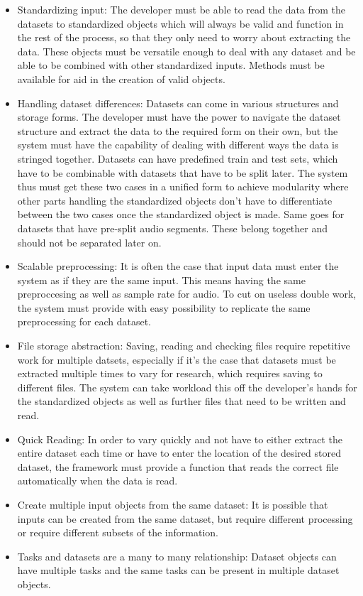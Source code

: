 \begin{itemize}
	\item Standardizing input: The developer must be able to read the data from the datasets to standardized objects which will always be valid and function in the rest of the process, so that they only need to worry about extracting the data. These objects must be versatile enough to deal with any dataset and be able to be combined with other standardized inputs. Methods must be available for aid in the creation of valid objects.
	\item Handling dataset differences: Datasets can come in various structures and storage forms. The developer must have the power to navigate the dataset structure and extract the data to the required form on their own, but the system must have the capability of dealing with different ways the data is stringed together. Datasets can have predefined train and test sets, which have to be combinable with datasets that have to be split later. The system thus must get these two cases in a unified form to achieve modularity where other parts handling the standardized objects don't have to differentiate between the two cases once the standardized object is made. Same goes for datasets that have pre-split audio segments. These belong together and should not be separated later on.
	\item Scalable preprocessing: It is often the case that input data must enter the system as if they are the same input. This means having the same preproccesing as well as sample rate for audio. To cut on useless double work, the system must provide with easy possibility to replicate the same preprocessing for each dataset.
	\item File storage abstraction: Saving, reading and checking files require repetitive work for multiple datsets, especially if it's the case that datasets must be extracted multiple times to vary for research, which requires saving to different files. The system can take workload this off the developer's hands for the standardized objects as well as further files that need to be written and read.
	\item Quick Reading: In order to vary quickly and not have to either extract the entire dataset each time or have to enter the location of the desired stored dataset, the framework must provide a function that reads the correct file automatically when the data is read. 
	\item Create multiple input objects from the same dataset: It is possible that inputs can be created from the same dataset, but require different processing or require different subsets of the information. 
	\item Tasks and datasets are a many to many relationship: Dataset objects can have multiple tasks and the same tasks can be present in multiple dataset objects.
\end{itemize}


